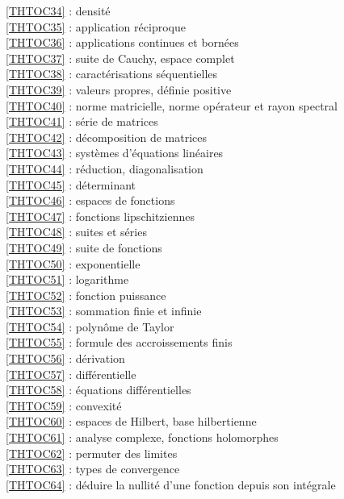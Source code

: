 \ref {THTOC34} : densité\\
\ref {THTOC35} : application réciproque\\
\ref {THTOC36} : applications continues et bornées\\
\ref {THTOC37} : suite de Cauchy, espace complet\\
\ref {THTOC38} : caractérisations séquentielles\\
\ref {THTOC39} : valeurs propres, définie positive\\
\ref {THTOC40} : norme matricielle, norme opérateur et rayon spectral\\
\ref {THTOC41} : série de matrices\\
\ref {THTOC42} : décomposition de matrices\\
\ref {THTOC43} : systèmes d'équations linéaires\\
\ref {THTOC44} : réduction, diagonalisation\\
\ref {THTOC45} : déterminant\\
\ref {THTOC46} : espaces de fonctions\\
\ref {THTOC47} : fonctions lipschitziennes\\
\ref {THTOC48} : suites et séries\\
\ref {THTOC49} : suite de fonctions\\
\ref {THTOC50} : exponentielle\\
\ref {THTOC51} : logarithme\\
\ref {THTOC52} : fonction puissance\\
\ref {THTOC53} : sommation finie et infinie\\
\ref {THTOC54} : polynôme de Taylor\\
\ref {THTOC55} : formule des accroissements finis\\
\ref {THTOC56} : dérivation\\
\ref {THTOC57} : différentielle\\
\ref {THTOC58} : équations différentielles\\
\ref {THTOC59} : convexité\\
\ref {THTOC60} : espaces de Hilbert, base hilbertienne\\
\ref {THTOC61} : analyse complexe, fonctions holomorphes\\
\ref {THTOC62} : permuter des limites\\
\ref {THTOC63} : types de convergence\\
\ref {THTOC64} : déduire la nullité d'une fonction depuis son intégrale\\
